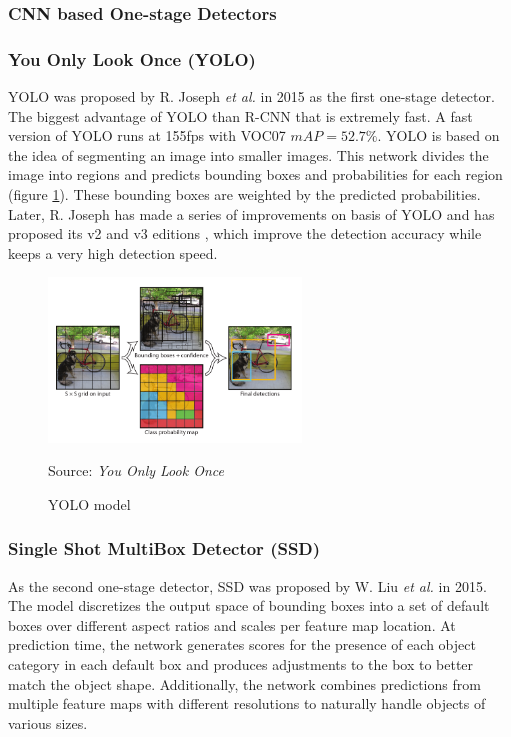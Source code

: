 \documentclass[12pt]{article}
\newcommand{\source}[1]{\caption*{Source: \emph{#1}} }
\begin{document}
\subsubsection{CNN based One-stage Detectors}
\label{sec:one_stage}

\subsubsection*{You Only Look Once (YOLO)}
\label{sec:yolo}
YOLO was proposed by R. Joseph \emph{et al.} in 2015 \cite{redmon2016you} as the first 
one-stage detector. The biggest advantage of YOLO than R-CNN that is extremely fast.
A fast version of YOLO runs at 155fps with VOC07 $mAP=52.7\%$. 
YOLO is based on the idea of segmenting an image into smaller images. 
This network divides the image into regions and predicts bounding boxes and 
probabilities for each region (figure \ref{fig:yolo}). These bounding boxes are weighted by the predicted 
probabilities. Later, R. Joseph has made a series of improvements on basis of YOLO 
and has proposed its v2 and v3 editions \cite{redmon2016yolo9000, redmon2018yolov3}, 
which improve the detection accuracy while keeps a very high detection speed.

\begin{figure}[htp]
    \centering
    \includegraphics[width=0.6\textwidth]{images/yolo.png}
    \caption{YOLO model}
    \label{fig:yolo}
    \source{You Only Look Once \cite{redmon2016you}}
\end{figure}

\subsubsection*{Single Shot MultiBox Detector (SSD)}
\label{sec:ssd}
As the second one-stage detector, SSD \cite{liu2016ssd} was proposed by W. Liu 
\emph{et al.} in 2015. The model discretizes the output space of bounding boxes 
into a set of default boxes over different aspect ratios and scales per feature 
map location. At prediction time, the network generates scores for the presence 
of each object category in each default box and produces adjustments to the box 
to better match the object shape. Additionally, the network combines predictions 
from multiple feature maps with different resolutions to naturally handle objects 
of various sizes. 
\end{document}
